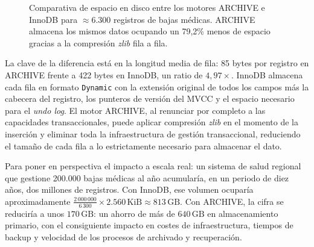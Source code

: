 \documentclass[../main.tex]{subfiles}
\begin{document}
\begin{figure}[htbp]
    \centering
    \caption{Comparativa de espacio en disco entre los motores ARCHIVE e InnoDB para $\approx$6.300 registros de bajas médicas. ARCHIVE almacena los mismos datos ocupando un 79,2\% menos de espacio gracias a la compresión \textit{zlib} fila a fila.}
    \label{fig:grafica_storage}
\end{figure}

La clave de la diferencia está en la longitud media de fila: 85 bytes por registro en ARCHIVE frente a 422 bytes en InnoDB, un ratio de $4{,}97\times$. InnoDB almacena cada fila en formato \texttt{Dynamic} con la extensión original de todos los campos más la cabecera del registro, los punteros de versión del MVCC y el espacio necesario para el \textit{undo log}. El motor ARCHIVE, al renunciar por completo a las capacidades transaccionales, puede aplicar compresión \textit{zlib} en el momento de la inserción y eliminar toda la infraestructura de gestión transaccional, reduciendo el tamaño de cada fila a lo estrictamente necesario para almacenar el dato.

Para poner en perspectiva el impacto a escala real: un sistema de salud regional que gestione 200.000 bajas médicas al año acumularía, en un periodo de diez años, dos millones de registros. Con InnoDB, ese volumen ocuparía aproximadamente $\frac{2\,000\,000}{6\,300} \times 2.560\,\text{KiB} \approx 813\,\text{GB}$. Con ARCHIVE, la cifra se reduciría a unos $170\,\text{GB}$: un ahorro de más de $640\,\text{GB}$ en almacenamiento primario, con el consiguiente impacto en costes de infraestructura, tiempos de backup y velocidad de los procesos de archivado y recuperación.
\end{document}
